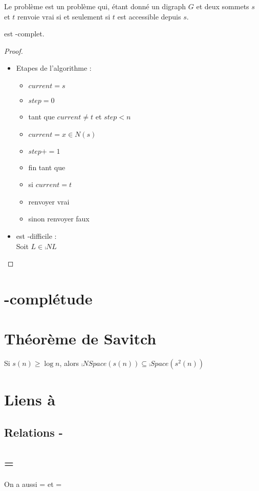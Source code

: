 \documentclass{cours}
\begin{document}
\begin{definition}
    Le problème  est un problème qui, étant donné un digraph $G$ et deux sommets $s$ et $t$ renvoie vrai si et seulement si $t$ est accessible depuis $s$. 
\end{definition}

\begin{proposition}
     est -complet.
\end{proposition}
\begin{proof}
    \begin{itemize}
        \item Etapes de l'algorithme : 
        \begin{itemize}
            \item $current = s$
            \item $step = 0$
            \item tant que $current \neq t$ et $step < n$
            \item $current = x \in N(s)$
            \item $step += 1$
            \item fin tant que
            \item si $current = t$
            \item renvoyer vrai
            \item sinon renvoyer faux
        \end{itemize}
        \item {} est -difficile :\\
        Soit $L\in \comp{NL}$
    \end{itemize}
\end{proof}


\section{-complétude}

\section{Théorème de Savitch}
\begin{theorem}
    Si $s(n) \geq \log n$, alors $\comp{NSpace}(s(n)) \subseteq \comp{Space}(s^{2}(n))$
\end{theorem}




\section{Liens à }
\subsection{Relations  - }

\subsection{ = }
On a aussi  =  et  = 
\end{document}

